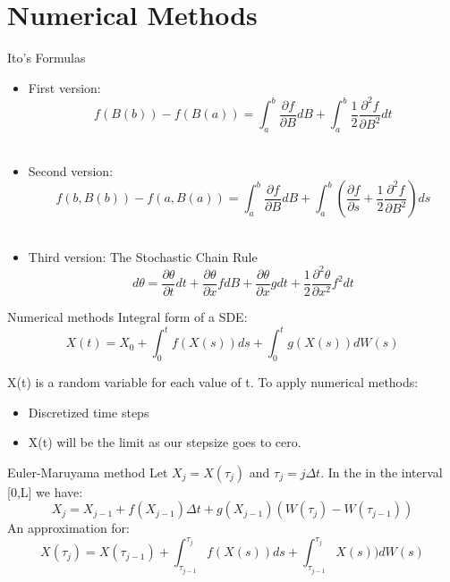 
\section{Numerical Methods}

\begin{frame}{Ito's Formulas}
  	\begin{itemize}
   		\item First version: $$f(B(b))-f(B(a))=\int_{a}^{b}{\frac{\partial f}{\partial B} 				dB}+\int_{a}^{b}{\frac{1}{2} \frac{\partial^2 f}{\partial B^2} dt} $$\\
    		\item Second version: $$f(b,B(b))-f(a,B(a))=\int_{a}^{b}{\frac{\partial f}{\partial B} 			dB}+\int_{a}^{b}{(\frac{\partial f}{\partial s}+\frac{1}{2}\frac{\partial ^2 f}{\partial 		B^2}) ds}$$\\
  		\item  Third version: The Stochastic Chain Rule $$d\theta=\frac{\partial\theta}{\partial 		t}dt+\frac{\partial\theta}{\partial x}f dB+\frac{\partial\theta}{\partial x}g 					dt+\frac{1}{2}\frac{\partial^2\theta}{\partial x^2}f^2dt$$
  	\end{itemize}
\end{frame}

\begin{frame}{Numerical methods}
Integral form of a SDE: 
$$X(t)=X_0+\int_{0}^{t}f(X(s))ds+\int_{0}^{t}g(X(s))dW(s)$$

X(t) is a random variable for each value of t. To apply numerical methods:
	\begin{itemize}
		\item Discretized time steps	
		\item X(t) will be the limit as our stepsize goes to cero.
	\end{itemize}
\end{frame}

\begin{frame}{Euler-Maruyama method}
Let $X_j=X(\tau_j)$ and $\tau_j=j\Delta t$. In the in the interval [0,L] we have:\bigskip\\
$$X_j=X_{j-1}+f(X_{j-1})\Delta t+g(X_{j-1})(W(\tau_j)-W(\tau_{j-1}))$$
 An approximation for:
$$X(\tau_j)=X(\tau_{j-1})+\int_{\tau_{j-1}}^{\tau_{j}}f(X(s))ds+\int_
{\tau_{j-1}}^{\tau_{j}}X(s))dW(s)$$
\end{frame}

